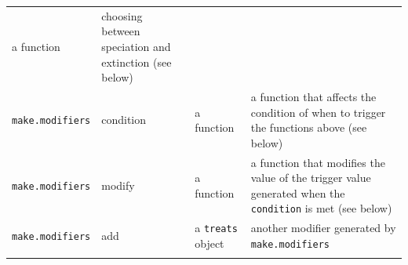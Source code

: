 \documentclass[
]{book}
\begin{document}
\begin{longtable}[]{@{}llll@{}}
\begin{minipage}[t]{0.14\columnwidth}
a function\strut
\end{minipage} & \begin{minipage}[t]{0.33\columnwidth}\raggedright
choosing between speciation and extinction (see below)\strut
\end{minipage}\tabularnewline
\begin{minipage}[t]{0.19\columnwidth}\raggedright
\texttt{make.modifiers}\strut
\end{minipage} & \begin{minipage}[t]{0.23\columnwidth}\raggedright
condition\strut
\end{minipage} & \begin{minipage}[t]{0.14\columnwidth}\raggedright
a function\strut
\end{minipage} & \begin{minipage}[t]{0.33\columnwidth}\raggedright
a function that affects the condition of when to trigger the functions above (see below)\strut
\end{minipage}\tabularnewline
\begin{minipage}[t]{0.19\columnwidth}\raggedright
\texttt{make.modifiers}\strut
\end{minipage} & \begin{minipage}[t]{0.23\columnwidth}\raggedright
modify\strut
\end{minipage} & \begin{minipage}[t]{0.14\columnwidth}\raggedright
a function\strut
\end{minipage} & \begin{minipage}[t]{0.33\columnwidth}\raggedright
a function that modifies the value of the trigger value generated when the \texttt{condition} is met (see below)\strut
\end{minipage}\tabularnewline
\begin{minipage}[t]{0.19\columnwidth}\raggedright
\texttt{make.modifiers}\strut
\end{minipage} & \begin{minipage}[t]{0.23\columnwidth}\raggedright
add\strut
\end{minipage} & \begin{minipage}[t]{0.14\columnwidth}\raggedright
a \texttt{treats} object\strut
\end{minipage} & \begin{minipage}[t]{0.33\columnwidth}\raggedright
another modifier generated by \texttt{make.modifiers}\strut
\end{minipage}\tabularnewline
\begin{minipage}[t]{0.19\columnwidth}\raggedright

\end{minipage}
\end{longtable}
\end{document}
